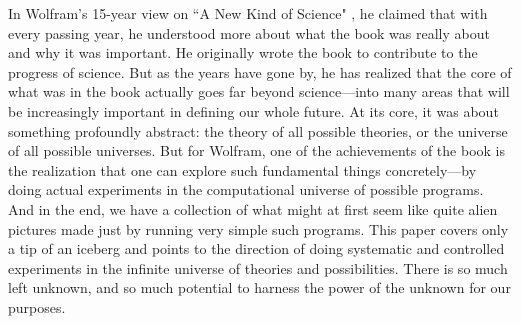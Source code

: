 \documentclass[12pt]{article}
\numberwithin{figure}{section} %
\begin{document}
In Wolfram's 15-year view on “A New Kind of Science" \cite{15 year view}, he claimed that with every passing year, he understood more about what the book was really about and why it was important. He originally wrote the book to contribute to the progress of science. But as the years have gone by, he has realized that the core of what was in the book actually goes far beyond science—into many areas that will be increasingly important in defining our whole future. At its core, it was about something profoundly abstract: the theory of all possible theories, or the universe of all possible universes. But for Wolfram, one of the achievements of the book is the realization that one can explore such fundamental things concretely—by doing actual experiments in the computational universe of possible programs. And in the end, we have a collection of what might at first seem like quite alien pictures made just by running very simple such programs. This paper covers only a tip of an iceberg and points to the direction of doing systematic and controlled experiments in the infinite universe of theories and possibilities. There is so much left unknown, and so much potential to harness the power of the unknown for our purposes. 
\newpage
\end{document}
